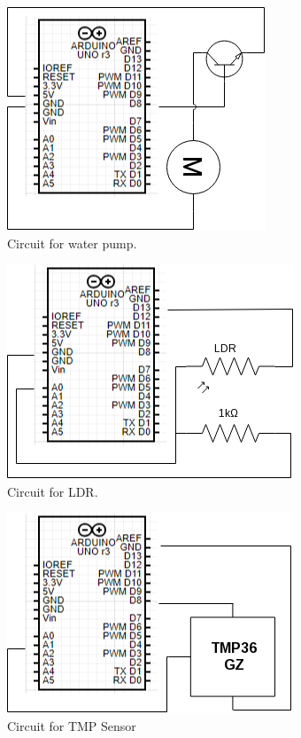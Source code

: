 \documentclass[a4paper,12pt,oneside,openright,titlepage]{book}
\begin{document}
\begin{figure}[!ht]
  \centering
      \includegraphics[scale=0.9]{Pumpan}
  \caption{Circuit for water pump.}
  \label{fig:WaterPumpCircuit}
\end{figure}

\begin{figure}[!ht]
  \centering
      \includegraphics[scale=0.9]{LDR}
  \caption{Circuit for LDR.}
  \label{fig:LDRCircuit}
\end{figure}

\begin{figure}[!ht]
  \centering
      \includegraphics[scale=0.9]{Arduinoxml}
  \caption{Circuit for TMP Sensor}
  \label{fig:TMP36GZCircuit}
\end{figure}
\end{document}
